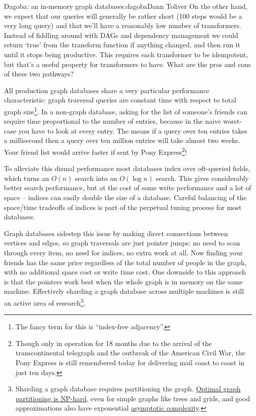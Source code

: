 \begin{aosachapter}{Dagoba: an in-memory graph database}{s:dagoba}{Dann Toliver}
On the other hand, we expect that our queries will generally be rather
short (100 steps would be a very long query) and that we'll have a
reasonably low number of transformers. Instead of fiddling around with
DAGs and dependency management we could return `true' from the transform
function if anything changed, and then run it until it stops being
productive. This requires each transformer to be idempotent, but that's
a useful property for transformers to have. What are the pros and cons
of these two pathways?

\label{performance}

All production graph databases share a very particular performance
characteristic: graph traversal queries are constant time with respect
to total graph size\footnote{The fancy term for this is ``index-free
  adjacency''.}. In a non-graph database, asking for the list of
someone's friends can require time proportional to the number of
entries, because in the naive worst-case you have to look at every
entry. The means if a query over ten entries takes a millisecond then a
query over ten million entries will take almost two weeks. Your friend
list would arrive faster if sent by Pony Express\footnote{Though only in
  operation for 18 months due to the arrival of the transcontinental
  telegraph and the outbreak of the American Civil War, the Pony Express
  is still remembered today for delivering mail coast to coast in just
  ten days.}!

To alleviate this dismal performance most databases index over
oft-queried fields, which turns an $O(n)$ search into an $O(\log{}n)$
search. This gives considerably better search performance, but at the
cost of some write performance and a lot of space -- indices can easily
double the size of a database. Careful balancing of the space/time
tradeoffs of indices is part of the perpetual tuning process for most
databases.

Graph databases sidestep this issue by making direct connections between
vertices and edges, so graph traversals are just pointer jumps: no need
to scan through every item, no need for indices, no extra work at all.
Now finding your friends has the same price regardless of the total
number of people in the graph, with no additional space cost or write
time cost. One downside to this approach is that the pointers work best
when the whole graph is in memory on the same machine. Effectively
sharding a graph database across multiple machines is still an active
area of research\footnote{Sharding a graph database requires
  partitioning the graph.
  \href{http://dl.acm.org/citation.cfm?doid=1007912.1007931}{Optimal
  graph partitioning is NP-hard}, even for simple graphs like trees and
  grids, and good approximations also have exponential
  \href{http://arxiv.org/pdf/1311.3144v2.pdf}{asymptotic complexity}.}.


\end{aosachapter}
